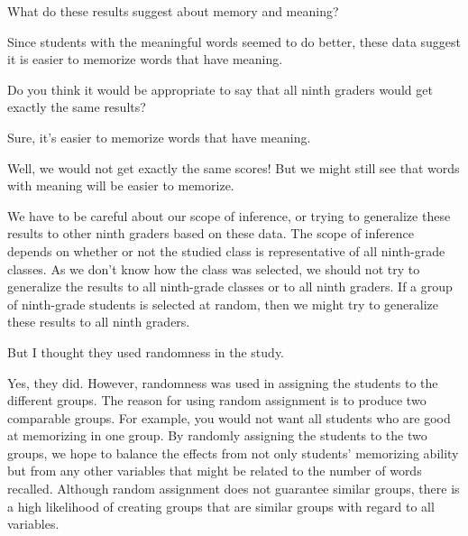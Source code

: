 {\begin{scriptlist}
      \item [Teacher:] What do these results suggest about memory and meaning?
      
      \item [Student N:] Since students with the meaningful words seemed to do better, these data suggest it is easier to memorize words that have meaning.
      
      \item [Teacher:] Do you think it would be appropriate to say that all ninth graders would get exactly the same results?
      
      \item [Student O:] Sure, it's easier to memorize words that have meaning.
      
      \item [Student P:] Well, we would not get exactly the same scores! But we might still see that words with meaning will be easier to memorize.
      
      \item [Teacher:] We have to be careful about our scope of inference, or trying to generalize these results to other ninth graders based on these data. The scope of inference depends on whether or not the studied class is representative of all ninth-grade classes. As we don't know how the class was selected, we should not try to generalize the results to all ninth-grade classes or to all ninth graders. If a group of ninth-grade students is selected at random, then we might try to generalize these results to all ninth graders.
      
      \item [Student Q:] But I thought they used randomness in the study.
      
      \item [Teacher:] Yes, they did. However, randomness was used in assigning the students to the different groups. The reason for using random assignment is to produce two comparable groups. For example, you would not want all students who are good at memorizing in one group. By randomly assigning the students to the two groups, we hope to balance the effects from not only students' memorizing ability but from any other variables that might be related to the number of words recalled. Although random assignment does not guarantee similar groups, there is a high likelihood of creating groups that are similar groups with regard to all variables.
    \end{scriptlist}

}
